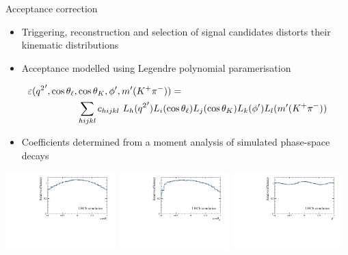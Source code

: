 \documentclass[aspectratio=1610]{beamer}
\begin{document}
\begin{frame}{Acceptance correction}

\begin{itemize}
  \item Triggering, reconstruction and selection of signal candidates distorts their kinematic distributions
  \item Acceptance modelled using Legendre polynomial paramerisation
\end{itemize}
\vspace{0.1cm}
\begin{equation*}
\begin{split}
\varepsilon({q^2}',\cos{\theta_\ell},&\cos{\theta_K},\phi',m'({{K}^+}{{\pi}^-})) = \\
& \sum_{hijkl} c_{hijkl}~L_{h}({q^2}')L_{i}(\cos{\theta_\ell})L_{j}(\cos{\theta_K})L_{k}(\phi')L_{l}(m'({{K}^+}{{\pi}^-}))
 \end{split}
\end{equation*}
\begin{itemize}
  \item Coefficients determined from a moment analysis of simulated phase-space \BdToKpimm decays
\end{itemize}

\begin{center}
\includegraphics[width=0.32\textwidth]{figs/kpimm/acceptance/Fig3a.pdf}
\includegraphics[width=0.32\textwidth]{figs/kpimm/acceptance/Fig3b.pdf}
\includegraphics[width=0.32\textwidth]{figs/kpimm/acceptance/Fig3c.pdf}
\end{center}

\end{frame}
\end{document}
